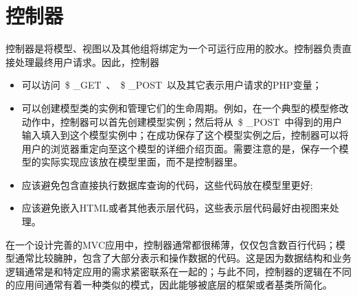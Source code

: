 \section{控制器} 

控制器是将模型、视图以及其他组将绑定为一个可运行应用的胶水。控制器负责直接处理最终用户请求。因此，控制器

\begin{itemize}
\item 可以访问~\$ \_GET~、~\$ \_POST~以及其它表示用户请求的PHP变量； 
\item 可以创建模型类的实例和管理它们的生命周期。例如，在一个典型的模型修改动作中，控制器可以首先创建模型实例；然后将从~\$ \_POST~中得到的用户输入填入到这个模型实例中；在成功保存了这个模型实例之后，控制器可以将用户的浏览器重定向至这个模型的详细介绍页面。需要注意的是，保存一个模型的实际实现应该放在模型里面，而不是控制器里。
\item 应该避免包含直接执行数据库查询的代码，这些代码放在模型里更好;
\item  应该避免嵌入HTML或者其他表示层代码，这些表示层代码最好由视图来处理。
\end{itemize}


在一个设计完善的MVC应用中，控制器通常都很稀薄，仅仅包含数百行代码；模型通常比较臃肿，包含了大部分表示和操作数据的代码。这是因为数据结构和业务逻辑通常是和特定应用的需求紧密联系在一起的；与此不同，控制器的逻辑在不同的应用间通常有着一种类似的模式，因此能够被底层的框架或者基类所简化。